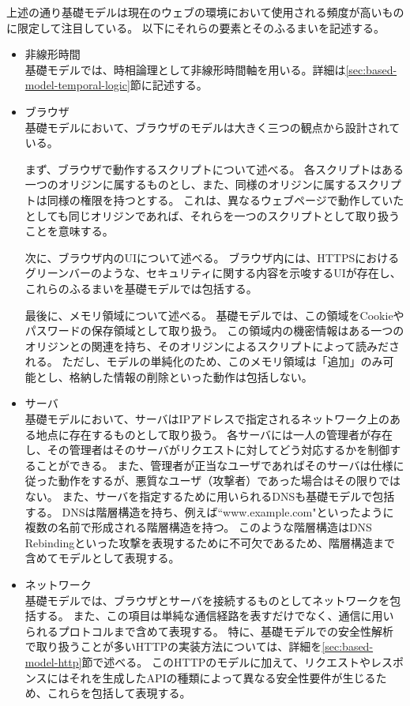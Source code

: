 \documentclass[12pt,a4paper]{jbook}
\begin{document}
上述の通り基礎モデルは現在のウェブの環境において使用される頻度が高いものに限定して注目している。
以下にそれらの要素とそのふるまいを記述する。
\begin{itemize}
\item 非線形時間 \\
基礎モデルでは、時相論理として非線形時間軸を用いる。詳細は\ref{sec:based-model-temporal-logic}節に記述する。
\item ブラウザ \\
基礎モデルにおいて、ブラウザのモデルは大きく三つの観点から設計されている。

まず、ブラウザで動作するスクリプトについて述べる。
各スクリプトはある一つのオリジンに属するものとし、また、同様のオリジンに属するスクリプトは同様の権限を持つとする。
これは、異なるウェブページで動作していたとしても同じオリジンであれば、それらを一つのスクリプトとして取り扱うことを意味する。

次に、ブラウザ内のUIについて述べる。
ブラウザ内には、HTTPSにおけるグリーンバーのような、セキュリティに関する内容を示唆するUIが存在し、これらのふるまいを基礎モデルでは包括する。

最後に、メモリ領域について述べる。
基礎モデルでは、この領域をCookieやパスワードの保存領域として取り扱う。
この領域内の機密情報はある一つのオリジンとの関連を持ち、そのオリジンによるスクリプトによって読みだされる。
ただし、モデルの単純化のため、このメモリ領域は「追加」のみ可能とし、格納した情報の削除といった動作は包括しない。
\item サーバ \\
基礎モデルにおいて、サーバはIPアドレスで指定されるネットワーク上のある地点に存在するものとして取り扱う。
各サーバには一人の管理者が存在し、その管理者はそのサーバがリクエストに対してどう対応するかを制御することができる。
また、管理者が正当なユーザであればそのサーバは仕様に従った動作をするが、悪質なユーザ（攻撃者）であった場合はその限りではない。
また、サーバを指定するために用いられるDNSも基礎モデルで包括する。
DNSは階層構造を持ち、例えば``www.example.com"といったように複数の名前で形成される階層構造を持つ。
このような階層構造はDNS Rebinding\cite{dns-rebinding}といった攻撃を表現するために不可欠であるため、階層構造まで含めてモデルとして表現する。
\item ネットワーク \\
基礎モデルでは、ブラウザとサーバを接続するものとしてネットワークを包括する。
また、この項目は単純な通信経路を表すだけでなく、通信に用いられるプロトコルまで含めて表現する。
特に、基礎モデルでの安全性解析で取り扱うことが多いHTTPの実装方法については、詳細を\ref{sec:based-model-http}節で述べる。
このHTTPのモデルに加えて、リクエストやレスポンスにはそれを生成したAPIの種類によって異なる安全性要件が生じるため、これらを包括して表現する。
\end{itemize}
\end{document}
